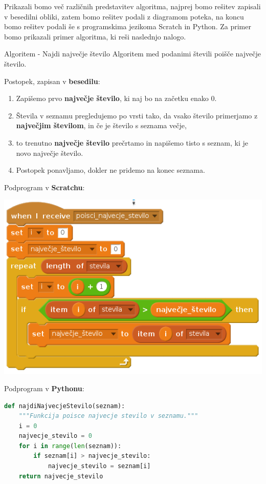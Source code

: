 Prikazali bomo več različnih predstavitev algoritma, najprej bomo
rešitev zapisali v besedilni obliki, zatem bomo rešitev podali z
diagramom poteka, na koncu bomo rešitev podali še s programskima
jezikoma Scratch in Python. Za primer bomo prikazali primer algoritma,
ki reši naslednjo nalogo.



\begin{examplebox}[label={prog:al01}]{Algoritem - Najdi največje število}
Algoritem med podanimi števili poišče največje število.

Postopek, zapisan v \textbf{besedilu}:
\begin{enumerate}
\tightlist
\item Zapišemo prvo \textbf{največje število}, ki naj bo na začetku enako $0$. 
\item Števila v seznamu pregledujemo po vrsti tako, da vsako število primerjamo z \textbf{največjim številom}, in če je število s
  seznama večje, 
\item to trenutno \textbf{največje število} prečrtamo in napišemo
  tisto s seznam, ki je novo največje število.
\item Postopek ponavljamo, dokler ne pridemo na konec seznama.
\end{enumerate}


Podprogram v \textbf{Scratchu}:

    \includegraphics [width=0.6\linewidth, keepaspectratio =
    1] {./images/scratchImg/01-Scr_Alg-NajvecjeSt-img_trs.png}

Podprogram v \textbf{Pythonu}:

\begin{lstlisting}[language=Python]
def najdiNajvecjeStevilo(seznam):
    """Funkcija poisce najvecje stevilo v seznamu."""
    i = 0
    najvecje_stevilo = 0
    for i in range(len(seznam)):
        if seznam[i] > najvecje_stevilo:
            najvecje_stevilo = seznam[i]
    return najvecje_stevilo
\end{lstlisting}
\end{examplebox}

